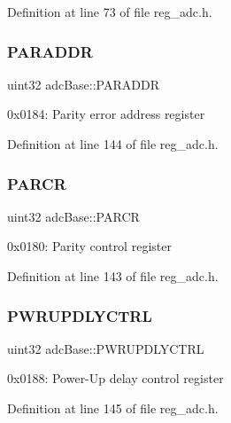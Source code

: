 Definition at line 73 of file reg\+\_\+adc.\+h.

\mbox{\label{structadcBase_ad03e7164c5587a9427ce55c8cb88f74e}} 
\subsubsection{\texorpdfstring{P\+A\+R\+A\+D\+DR}{PARADDR}}
{\footnotesize\ttfamily uint32 adc\+Base\+::\+P\+A\+R\+A\+D\+DR}

0x0184\+: Parity error address register 

Definition at line 144 of file reg\+\_\+adc.\+h.

\mbox{\label{structadcBase_a258b46156bf02ed3683eb85da01542e4}} 
\subsubsection{\texorpdfstring{P\+A\+R\+CR}{PARCR}}
{\footnotesize\ttfamily uint32 adc\+Base\+::\+P\+A\+R\+CR}

0x0180\+: Parity control register 

Definition at line 143 of file reg\+\_\+adc.\+h.

\mbox{\label{structadcBase_a21f4e9dc776bc441153a528cb7dc7da0}} 
\subsubsection{\texorpdfstring{P\+W\+R\+U\+P\+D\+L\+Y\+C\+T\+RL}{PWRUPDLYCTRL}}
{\footnotesize\ttfamily uint32 adc\+Base\+::\+P\+W\+R\+U\+P\+D\+L\+Y\+C\+T\+RL}

0x0188\+: Power-\/\+Up delay control register 

Definition at line 145 of file reg\+\_\+adc.\+h.

\mbox{\label{structadcBase_a6662251d3a120476b32339f85c247c52}} 
